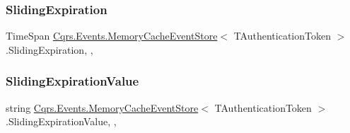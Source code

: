 \subsubsection{\texorpdfstring{Sliding\+Expiration}{SlidingExpiration}}
{\footnotesize\ttfamily Time\+Span \hyperlink{classCqrs_1_1Events_1_1MemoryCacheEventStore}{Cqrs.\+Events.\+Memory\+Cache\+Event\+Store}$<$ T\+Authentication\+Token $>$.Sliding\+Expiration\hspace{0.3cm}{\ttfamily [get]}, {\ttfamily [set]}, {\ttfamily [protected]}}

\mbox{\label{classCqrs_1_1Events_1_1MemoryCacheEventStore_af45012b233f4f4c8ef3c00bf8fba7a80_af45012b233f4f4c8ef3c00bf8fba7a80}} 
\subsubsection{\texorpdfstring{Sliding\+Expiration\+Value}{SlidingExpirationValue}}
{\footnotesize\ttfamily string \hyperlink{classCqrs_1_1Events_1_1MemoryCacheEventStore}{Cqrs.\+Events.\+Memory\+Cache\+Event\+Store}$<$ T\+Authentication\+Token $>$.Sliding\+Expiration\+Value\hspace{0.3cm}{\ttfamily [get]}, {\ttfamily [set]}, {\ttfamily [protected]}}

